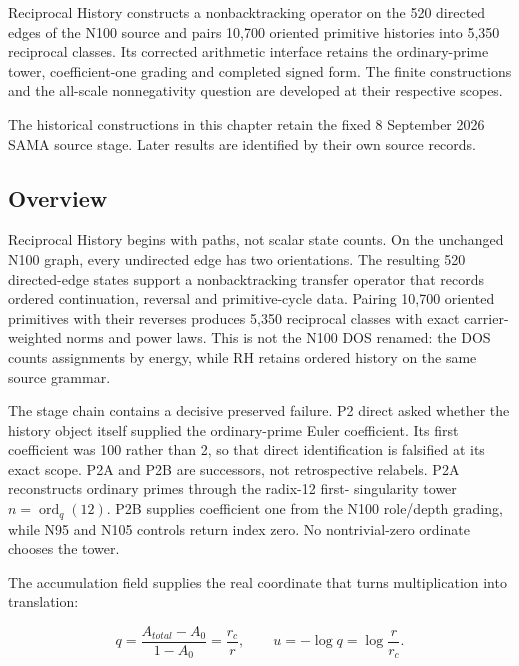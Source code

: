 \label{viii-ch09-reciprocal-history-and-the-completed-arithmetic-interface}

Reciprocal History constructs a nonbacktracking operator on the 520 directed edges of the N100 source and pairs 10,700 oriented primitive histories into 5,350 reciprocal classes. Its corrected arithmetic interface retains the ordinary-prime tower, coefficient-one grading and completed signed form. The finite constructions and the all-scale nonnegativity question are developed at their respective scopes.

The historical constructions in this chapter retain the fixed 8 September 2026 SAMA source stage. Later results are identified by their own source records.



\subsection{Overview}\label{viii-ch09-overview}

Reciprocal History begins with paths, not scalar state counts. On the
unchanged N100 graph, every undirected edge has two orientations. The
resulting 520 directed-edge states support a nonbacktracking transfer
operator that records ordered continuation, reversal and primitive-cycle
data. Pairing 10,700 oriented primitives with their reverses produces
5,350 reciprocal classes with exact carrier-weighted norms and power
laws. This is not the N100 DOS renamed: the DOS counts assignments by
energy, while RH retains ordered history on the same source grammar.

The stage chain contains a decisive preserved failure. P2 direct asked
whether the history object itself supplied the ordinary-prime Euler
coefficient. Its first coefficient was 100 rather than 2, so that direct
identification is falsified at its exact scope. P2A and P2B are
successors, not retrospective relabels. P2A reconstructs ordinary primes
through the radix-12 first- singularity tower
\(n=\operatorname{ord}_q(12)\). P2B supplies coefficient one from the
N100 role/depth grading, while N95 and N105 controls return index zero.
No nontrivial-zero ordinate chooses the tower.

The accumulation field supplies the real coordinate that turns
multiplication into translation:

\[
q=\frac{A_{total}-A_0}{1-A_0}=\frac{r_c}{r},
\qquad
u=-\log q=\log\frac r{r_c}.
\]


